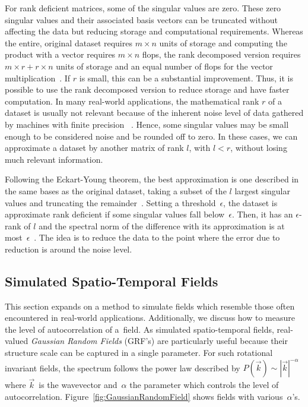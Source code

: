 \documentclass[ijgi,article,submit,moreauthors,pdftex,10pt,a4paper]{Definitions/mdpi}
\begin{document}
For rank deficient matrices, some of the singular values are zero. These zero singular values and their associated basis vectors can be truncated
without affecting the data but reducing storage and computational requirements. Whereas the entire, original dataset requires $m \times n$ units of
storage and computing the product with a vector requires $m \times n$ flops, the rank decomposed version requires $m \times r + r \times n$ units of
storage and an equal number of flops for the vector multiplication~\cite{Martinsson2016}. If $r$ is small, this can be a substantial improvement.
Thus, it is possible to use the rank decomposed version to reduce storage and have faster computation. In many real-world applications, the
mathematical rank $r$ of a dataset is usually not relevant because of the inherent noise level of data gathered by machines with finite precision
~\cite{Martinsson2016}. Hence, some singular values may be small enough to be considered noise and be rounded off to zero. In these cases, we can
approximate a dataset by another matrix of rank $l$, with $l < r$, without losing much relevant information.

Following the Eckart-Young theorem, the best approximation is one described in the same bases as the original dataset, taking a subset of the $l$
largest singular values and truncating the remainder~\cite{Eckart1936}. Setting a threshold~$\epsilon$, the dataset is approximate rank deficient if
some singular values fall below~$\epsilon$. Then, it has an $\epsilon$-rank of $l$ and the spectral norm of the difference with its approximation is
at most~$\epsilon$~\cite{Martinsson2016}. The idea is to reduce the data to the point where the error due to reduction is around the noise level.

\subsection{Simulated Spatio-Temporal Fields}
\label{sec:Materials and Methods/Simulated Spatio-Temporal Fields}
This section expands on a method to simulate fields which resemble those often encountered in real-world applications. Additionally, we discuss how to measure the level of autocorrelation of a~field.
As simulated spatio-temporal fields, real-valued \textit{Gaussian Random Fields} (GRF's) are particularly useful because their structure scale can be
captured in a single parameter. For such rotational invariant fields, the spectrum follows the power law described by $P(\vec{k}) \sim
|\vec{k}|^{-\alpha}$ where $\vec{k} \,$ is the wavevector and~$\alpha$ the parameter which controls the level of autocorrelation.
Figure~\ref{fig:GaussianRandomField} shows fields with various~$\alpha$'s.
\end{document}
